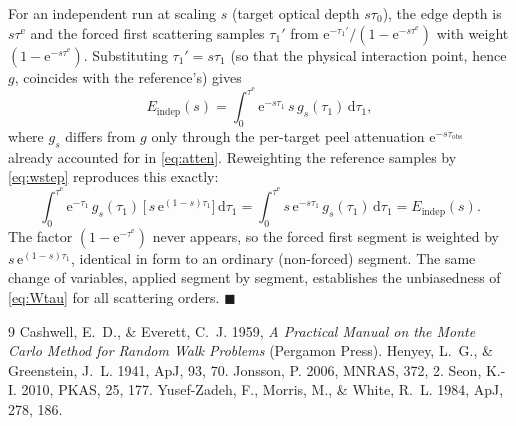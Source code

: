 \documentclass[english,a4paper]{kiseon_memo}
\newcommand{\rd}{\mathrm{d}}
\newcommand{\ee}{\mathrm{e}}
\newcommand{\obs}{\mathrm{obs}}
\newcommand{\edg}{\mathrm{e}}
\begin{document}
For an independent run at scaling $s$ (target optical depth $s\tau_0$), the edge
depth is $s\tau^{\edg}$ and the forced first scattering samples $\tau_1'$ from
$\ee^{-\tau_1'}/(1-\ee^{-s\tau^{\edg}})$ with weight $(1-\ee^{-s\tau^{\edg}})$.
Substituting $\tau_1'=s\tau_1$ (so that the physical interaction point, hence
$g$, coincides with the reference's) gives
\begin{equation}
  E_{\mathrm{indep}}(s)
  = \int_0^{\tau^{\edg}}\! \ee^{-s\tau_1}\,s\,g_s(\tau_1)\,\rd\tau_1 ,
\end{equation}
where $g_s$ differs from $g$ only through the per-target peel attenuation
$\ee^{-s\tau_\obs}$ already accounted for in \eqref{eq:atten}.  Reweighting the
reference samples by \eqref{eq:wstep} reproduces this exactly:
\begin{equation}
  \int_0^{\tau^{\edg}}\! \ee^{-\tau_1}\,g_s(\tau_1)\,
  \big[\,s\,\ee^{(1-s)\tau_1}\big]\,\rd\tau_1
  = \int_0^{\tau^{\edg}}\! s\,\ee^{-s\tau_1}\,g_s(\tau_1)\,\rd\tau_1
  = E_{\mathrm{indep}}(s) .
\end{equation}
The factor $(1-\ee^{-\tau^{\edg}})$ never appears, so the forced first segment is
weighted by $s\,\ee^{(1-s)\tau_1}$, identical in form to an ordinary
(non-forced) segment.  The same change of variables, applied segment by segment,
establishes the unbiasedness of \eqref{eq:Wtau} for all scattering orders.
\hfill$\blacksquare$

\begin{thebibliography}{9}
 Cashwell, E.~D., \& Everett, C.~J. 1959,
  \textit{A Practical Manual on the Monte Carlo Method for Random Walk
  Problems} (Pergamon Press).
 Henyey, L.~G., \& Greenstein, J.~L. 1941, ApJ, 93, 70.
 Jonsson, P. 2006, MNRAS, 372, 2.
 Seon, K.-I. 2010, PKAS, 25, 177.
 Yusef-Zadeh, F., Morris, M., \& White, R.~L. 1984, ApJ,
  278, 186.
\end{thebibliography}
\end{document}
